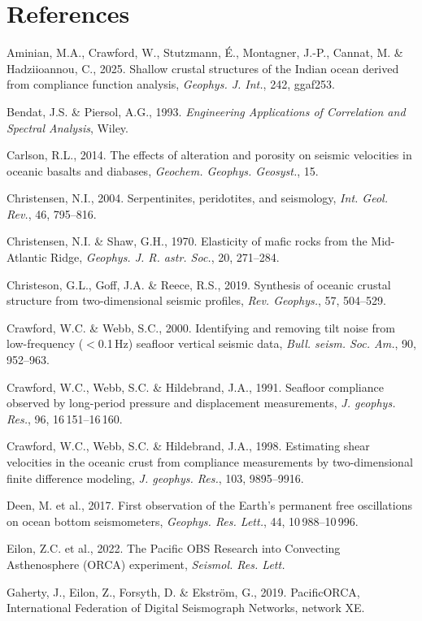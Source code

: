 \documentclass[10pt,a4paper,twocolumn]{article}
\begin{document}
\section*{References}
\begin{description}\setlength{\itemsep}{0pt}
\item Aminian, M.A., Crawford, W., Stutzmann, \'E., Montagner, J.-P., Cannat, M. \& Hadziioannou, C., 2025. Shallow crustal structures of the Indian ocean derived from compliance function analysis, \textit{Geophys. J. Int.}, 242, ggaf253.
\item Bendat, J.S. \& Piersol, A.G., 1993. \textit{Engineering Applications of Correlation and Spectral Analysis}, Wiley.
\item Carlson, R.L., 2014. The effects of alteration and porosity on seismic velocities in oceanic basalts and diabases, \textit{Geochem. Geophys. Geosyst.}, 15.
\item Christensen, N.I., 2004. Serpentinites, peridotites, and seismology, \textit{Int. Geol. Rev.}, 46, 795--816.
\item Christensen, N.I. \& Shaw, G.H., 1970. Elasticity of mafic rocks from the Mid-Atlantic Ridge, \textit{Geophys. J. R. astr. Soc.}, 20, 271--284.
\item Christeson, G.L., Goff, J.A. \& Reece, R.S., 2019. Synthesis of oceanic crustal structure from two-dimensional seismic profiles, \textit{Rev. Geophys.}, 57, 504--529.
\item Crawford, W.C. \& Webb, S.C., 2000. Identifying and removing tilt noise from low-frequency ($<$0.1\,Hz) seafloor vertical seismic data, \textit{Bull. seism. Soc. Am.}, 90, 952--963.
\item Crawford, W.C., Webb, S.C. \& Hildebrand, J.A., 1991. Seafloor compliance observed by long-period pressure and displacement measurements, \textit{J. geophys. Res.}, 96, 16\,151--16\,160.
\item Crawford, W.C., Webb, S.C. \& Hildebrand, J.A., 1998. Estimating shear velocities in the oceanic crust from compliance measurements by two-dimensional finite difference modeling, \textit{J. geophys. Res.}, 103, 9895--9916.
\item Deen, M. et al., 2017. First observation of the Earth's permanent free oscillations on ocean bottom seismometers, \textit{Geophys. Res. Lett.}, 44, 10\,988--10\,996.
\item Eilon, Z.C. et al., 2022. The Pacific OBS Research into Convecting Asthenosphere (ORCA) experiment, \textit{Seismol. Res. Lett.}
\item Gaherty, J., Eilon, Z., Forsyth, D. \& Ekstr\"om, G., 2019. PacificORCA, International Federation of Digital Seismograph Networks, network XE.

\end{description}
\end{document}
